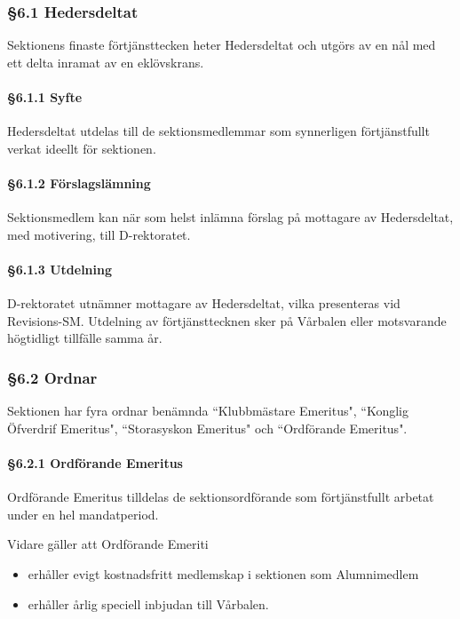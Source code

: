 \subsubsection{§6.1 Hedersdeltat}

Sektionens finaste förtjänsttecken heter Hedersdeltat och utgörs av en nål med ett delta inramat av en eklövskrans.

\paragraph{§6.1.1 Syfte}

Hedersdeltat utdelas till de sektionsmedlemmar som synnerligen förtjänstfullt verkat ideellt för sektionen.

\paragraph{§6.1.2 Förslagslämning}

Sektionsmedlem kan när som helst inlämna förslag på mottagare av Hedersdeltat, med motivering, till D-rektoratet.

\paragraph{§6.1.3 Utdelning}

D-rektoratet utnämner mottagare av Hedersdeltat, vilka presenteras vid Revisions-SM. Utdelning av förtjänsttecknen sker på Vårbalen eller motsvarande högtidligt tillfälle samma år.

\subsubsection{§6.2 Ordnar}

Sektionen har fyra ordnar benämnda ``Klubbmästare Emeritus", ``Konglig Öfverdrif Emeritus", ``Storasyskon Emeritus" och ``Ordförande Emeritus".

\paragraph{§6.2.1 Ordförande Emeritus}

Ordförande Emeritus tilldelas de sektionsordförande som förtjänstfullt arbetat under en hel mandatperiod.

Vidare gäller att Ordförande Emeriti

\begin{itemize}
  \item erhåller evigt kostnadsfritt medlemskap i sektionen som Alumnimedlem
  \item erhåller årlig speciell inbjudan till Vårbalen.
\end{itemize}

